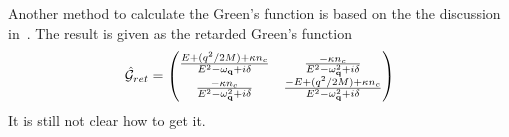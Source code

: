 Another method to calculate the Green's function is based on the the discussion in~\cite{Giorgini1998}\cite{Kovalev2013}.
The result is given as the retarded Green's function
\begin{equation}
\hat{\mathcal{G}}_{ret} =
  \begin{pmatrix}
    \frac{E+(q^2/2M) + \kappa n_c}{E^2-\omega_{\mathbf{q}} + i\delta} & \frac{-\kappa n_c}{E^2-\omega_{\mathbf{q}}^2 + i\delta} \\
    \frac{-\kappa n_c}{E^2-\omega_{\mathbf{q}}^2+i\delta} & \frac{-E+(q^2/2M)+ \kappa n_c}{E^2 - \omega_{\mathbf{q}}^2+i\delta}
  \end{pmatrix}
\end{equation}
It is still not clear how to get it.
